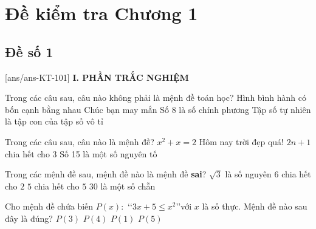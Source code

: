 \section*{Đề kiểm tra Chương 1}
\subsection*{Đề số 1}
\setcounter{ex}{0}\setcounter{bt}{0}
[ans/ans-KT-101]
\noindent\textbf{I. PHẦN TRẮC NGHIỆM}
\begin{ex}%
	Trong các câu sau, câu nào không phải là mệnh đề toán học?
	\choice
	{Hình bình hành có bốn cạnh bằng nhau}
	{\True Chúc bạn may mắn}
	{Số $8$ là số chính phương}
	{Tập số tự nhiên là tập con của tập số vô tỉ}
\end{ex}
\begin{ex}%
	Trong các câu sau, câu nào là mệnh đề?
	\choice
	{$x^2+x=2$}
	{Hôm nay trời đẹp quá!}
	{$2n+1$ chia hết cho 3}
	{\True Số 15 là một số nguyên tố}
\end{ex}
\begin{ex}%
	Trong các mệnh đề sau, mệnh đề nào là mệnh đề \textbf{sai}?
	\choice
	{\True $\sqrt{3}$ là số nguyên}
	{$6$ chia hết cho $2$}
	{$5$ chia hết cho $5$}
	{$30$ là một số chẵn}
\end{ex}
\begin{ex}%
	Cho mệnh đề chứa biến $P(x)\colon$ \lq\lq$3x+5\le x^2$\rq\rq với $x$ là số thực. Mệnh đề nào sau đây là đúng?
	\choice
	{$P(3)$}
	{$P(4)$}
	{$P(1)$}
	{\True $P(5)$}
\end{ex}
